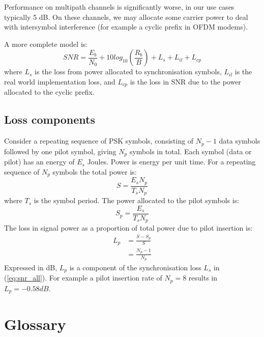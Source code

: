 \documentclass{article}
\begin{document}
Performance on multipath channels is significantly worse, in our use cases typically 5 dB.  On these channels, we may allocate some carrier power to deal with intersymbol interference (for example a cyclic prefix in OFDM modems).

A more complete model is:
\begin{equation} \label{eq:snr_all}
SNR = \frac{E_b}{N_0} + 10log_{10}\left(\frac{R_b}{B}\right) + L_s + L_{il} + L_{cp}
\end{equation}
where $L_s$ is the loss from power allocated to synchronisation symbols, $L_{il}$ is the real world implementation loss, and $L_{cp}$ is the loss in SNR due to the power allocated to the cyclic prefix.

\subsection{Loss components}

Consider a repeating sequence of PSK symbols, consisting of $N_p-1$ data symbols followed by one pilot symbol, giving $N_p$ symbols in total.  Each symbol (data or pilot) has an energy of $E_s$ Joules.  Power is energy per unit time.  For a repeating sequence of $N_p$ symbols the total power is:
\begin{equation}
S = \frac{E_sN_p}{T_sN_p}
\end{equation}
where $T_s$ is the symbol period. The power allocated to the pilot symbols is:
\begin{equation}
S_p = \frac{E_s}{T_sN_p}
\end{equation}The loss in signal power as a proportion of total power due to pilot insertion is:
\begin{equation}
\begin{split}
L_p &= \frac{S - S_p}{S} \\
    &= \frac{N_p-1}{N_p}
\end{split}
\end{equation}
Expressed in dB, $L_p$ is a component of the synchronisation loss $L_s$ in (\ref{eq:snr_all}). For example a pilot insertion rate of $N_p=8$ results in $L_p=-0.58dB$.
\section{Glossary}
\end{document}
